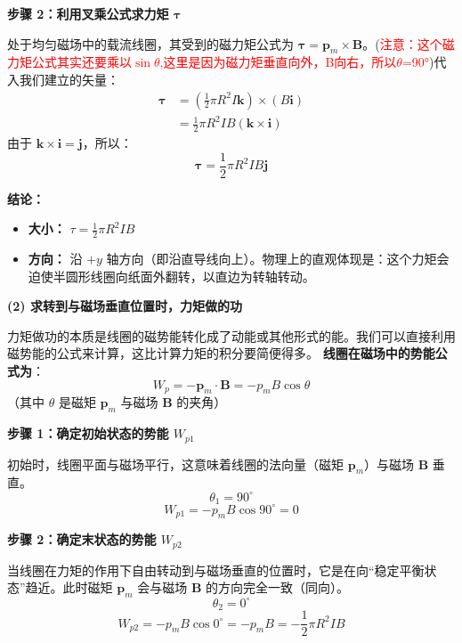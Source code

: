 \textbf{步骤 2：利用叉乘公式求力矩 $\boldsymbol{\tau}$}

处于均匀磁场中的载流线圈，其受到的磁力矩公式为 $\boldsymbol{\tau} = \mathbf{p}_m \times \mathbf{B}$。(\textcolor{red}{注意：这个磁力矩公式其实还要乘以$\sin\theta$,这里是因为磁力矩垂直向外，B向右，所以$\theta$=90°})代入我们建立的矢量：
\begin{align*}
	\boldsymbol{\tau} &= \left( \frac{1}{2}\pi R^2 I \mathbf{k} \right) \times (B\mathbf{i}) \\
	&= \frac{1}{2}\pi R^2 I B (\mathbf{k} \times \mathbf{i})
\end{align*}
由于 $\mathbf{k} \times \mathbf{i} = \mathbf{j}$，所以：
\begin{equation}\label{eq:9-19-2}
	\boldsymbol{\tau} = \frac{1}{2}\pi R^2 I B \mathbf{j}
\end{equation}

\textbf{结论：}
\begin{itemize}
	\item \textbf{大小：} $\tau = \frac{1}{2}\pi R^2 I B$
	\item \textbf{方向：} 沿 $+y$ 轴方向（即沿直导线向上）。物理上的直观体现是：这个力矩会迫使半圆形线圈向纸面外翻转，以直边为转轴转动。
\end{itemize}

\textbf{(2) 求转到与磁场垂直位置时，力矩做的功}

力矩做功的本质是线圈的磁势能转化成了动能或其他形式的能。我们可以直接利用磁势能的公式来计算，这比计算力矩的积分要简便得多。
\textbf{线圈在磁场中的势能公式为}：
\begin{equation}\label{eq:9-19-3}
	W_p = -\mathbf{p}_m \cdot \mathbf{B} = -p_m B \cos\theta
\end{equation}
（其中 $\theta$ 是磁矩 $\mathbf{p}_m$ 与磁场 $\mathbf{B}$ 的夹角）

\textbf{步骤 1：确定初始状态的势能 $W_{p1}$}

初始时，线圈平面与磁场平行，这意味着线圈的法向量（磁矩 $\mathbf{p}_m$）与磁场 $\mathbf{B}$ 垂直。
$$ \theta_1 = 90^\circ $$
\begin{equation}\label{eq:9-19-4}
	W_{p1} = -p_m B \cos 90^\circ = 0
\end{equation}

\textbf{步骤 2：确定末状态的势能 $W_{p2}$}

当线圈在力矩的作用下自由转动到与磁场垂直的位置时，它是在向“稳定平衡状态”趋近。此时磁矩 $\mathbf{p}_m$ 会与磁场 $\mathbf{B}$ 的方向完全一致（同向）。
$$ \theta_2 = 0^\circ $$
\begin{equation}\label{eq:9-19-5}
	W_{p2} = -p_m B \cos 0^\circ = -p_m B = -\frac{1}{2}\pi R^2 I B
\end{equation}

